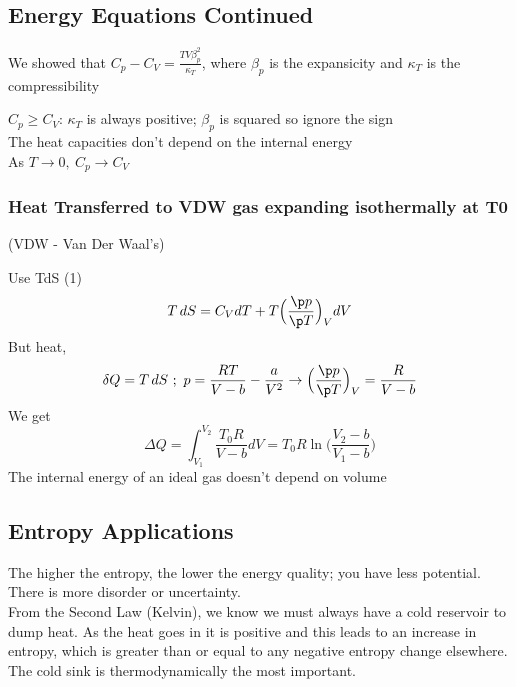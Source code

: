 \documentclass[a4paper, 11pt, normalem]{report}
\begin{document}
\chapter{}
\section{Energy Equations Continued}
We showed that $C_p - C_V = \frac{TV\beta_{p}^2}{\kappa_T}$, where $\beta_p$ is the expansicity and $\kappa_T$ is the compressibility

$C_p \geq C_V$: $\kappa_T$ is always positive; $\beta_p$ is squared so ignore the sign \\
The heat capacities don't depend on the internal energy \\
As $T \to 0,~ C_p \to C_V$

\subsection{Heat Transferred to VDW gas expanding isothermally at T0}
(VDW - Van Der Waal's)

Use TdS (1)
\begin{equation*}
    T\,dS = C_V dT + T\Big(\frac{\p p}{\p T}\Big)_V dV
\end{equation*}
But heat,
\begin{equation*}
    \delta Q = T\,dS ~;~ p = \frac{RT}{V - b} - \frac{a}{V^2} \to \Big(\frac{\p p}{\p T}\Big)_V = \frac{R}{V - b}
\end{equation*}
We get
\begin{equation*}
    \Delta Q = \int_{V_1}^{V_2} \frac{T_0 R}{V - b}dV = T_0 R\ln\Big(\frac{V_2 - b}{V_1 - b}\Big)
\end{equation*}
The internal energy of an ideal gas doesn't depend on volume

\section{Entropy Applications}
The higher the entropy, the lower the energy quality; you have less potential.
There is more disorder or uncertainty. \\
From the Second Law (Kelvin), we know we must always have a cold reservoir to dump heat.
As the heat goes in it is positive and this leads to an increase in entropy, which is greater than or equal to any negative entropy change elsewhere. \\
The cold sink is thermodynamically the most important.
\end{document}
